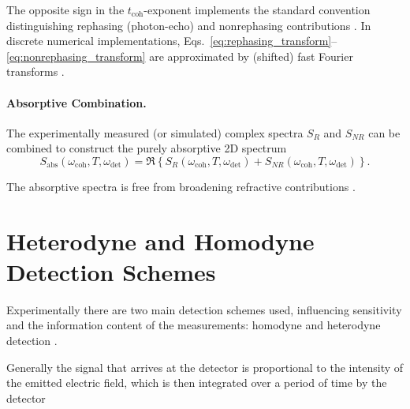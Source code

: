 \noindent 
The opposite sign in the $t_{\text{coh}}$-exponent implements the standard convention distinguishing rephasing (photon-echo) and nonrephasing contributions \cite{cho2009twodimensionalopticalspectroscopy, greenetal2024vibrationalcoherenceshalfbroadband}. In discrete numerical implementations, Eqs.~\eqref{eq:rephasing_transform}--\eqref{eq:nonrephasing_transform} are approximated by (shifted) fast Fourier transforms \cite{cho2009twodimensionalopticalspectroscopy, greenetal2024vibrationalcoherenceshalfbroadband}.

\paragraph{Absorptive Combination.}

\noindent 
The experimentally measured (or simulated) complex spectra $S_{R}$ and $S_{NR}$ can be combined to  construct the purely absorptive 2D spectrum \cite{mukamel1995principlesnonlinearoptical, jonas2003twodimensionalfemtosecondspectroscopy, greenetal2024vibrationalcoherenceshalfbroadband}
\begin{equation}
	S_{\text{abs}}(\omega_{\text{coh}}, T, \omega_{\text{det}})
	=
	\Re \left\{
	S_{R}(\omega_{\text{coh}}, T, \omega_{\text{det}}) + S_{NR}(\omega_{\text{coh}}, T, \omega_{\text{det}})
	\right\}.
	\label{eq:absorptive_spectrum}
\end{equation}

\noindent 
The absorptive spectra is free from broadening refractive contributions \cite{fullerogilvie2015experimentalimplementationstwodimensional}.





\section{Heterodyne and Homodyne Detection Schemes}
\label{sec:heterodyne_homodyne}

\noindent Experimentally there are two main detection schemes used, influencing sensitivity and the information content of the measurements: homodyne and heterodyne detection \cite{abramaviciusetal2009coherentmultidimensionaloptical}.

\noindent
Generally the signal that arrives at the detector is proportional to the intensity of the emitted electric field, which is then integrated over a period of time by the detector

